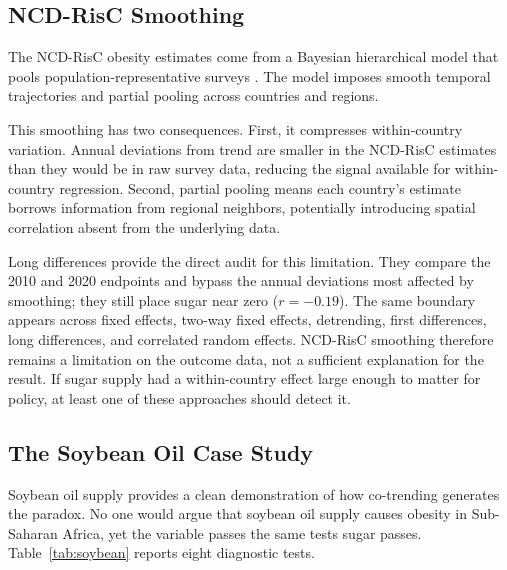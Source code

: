 \documentclass[letterpaper,11pt,leqno]{article}
\begin{document}
\subsection{NCD-RisC Smoothing}

The NCD-RisC obesity estimates come from a Bayesian hierarchical model that pools population-representative surveys \citep{ncdrisc2024bmi}. The model imposes smooth temporal trajectories and partial pooling across countries and regions.

This smoothing has two consequences. First, it compresses within-country variation. Annual deviations from trend are smaller in the NCD-RisC estimates than they would be in raw survey data, reducing the signal available for within-country regression. Second, partial pooling means each country's estimate borrows information from regional neighbors, potentially introducing spatial correlation absent from the underlying data.

Long differences provide the direct audit for this limitation. They compare the 2010 and 2020 endpoints and bypass the annual deviations most affected by smoothing; they still place sugar near zero ($r = -0.19$). The same boundary appears across fixed effects, two-way fixed effects, detrending, first differences, long differences, and correlated random effects. NCD-RisC smoothing therefore remains a limitation on the outcome data, not a sufficient explanation for the result. If sugar supply had a within-country effect large enough to matter for policy, at least one of these approaches should detect it.

\subsection{The Soybean Oil Case Study}

Soybean oil supply provides a clean demonstration of how co-trending generates the paradox. No one would argue that soybean oil supply causes obesity in Sub-Saharan Africa, yet the variable passes the same tests sugar passes. Table~\ref{tab:soybean} reports eight diagnostic tests.
\end{document}
